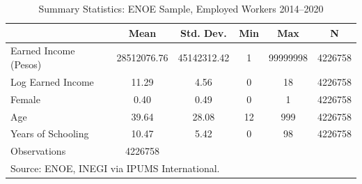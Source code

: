\begin{table}[htbp]\centering
\def\sym#1{\ifmmode^{#1}\else\(^{#1}\)\fi}
\caption{Summary Statistics: ENOE Sample, Employed Workers 2014--2020}
\begin{tabular}{l*{1}{ccccc}}
\hline\hline
                    &        Mean&   Std. Dev.&         Min&         Max&           N\\
\hline
Earned Income (Pesos)& 28512076.76& 45142312.42&           1&    99999998&     4226758\\
Log Earned Income   &       11.29&        4.56&           0&          18&     4226758\\
Female              &        0.40&        0.49&           0&           1&     4226758\\
Age                 &       39.64&       28.08&          12&         999&     4226758\\
Years of Schooling  &       10.47&        5.42&           0&          98&     4226758\\
\hline
Observations        &     4226758&            &            &            &            \\
\hline\hline
\multicolumn{6}{l}{\footnotesize Source: ENOE, INEGI via IPUMS International.}\\
\end{tabular}
\end{table}
